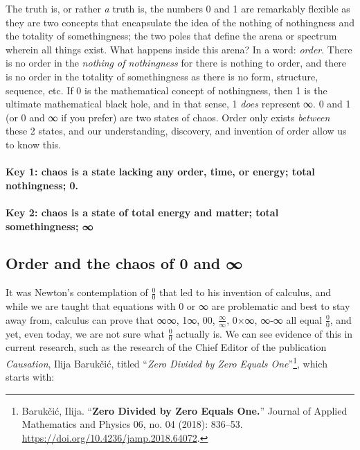 \documentclass[
]{article}
\begin{document}
The truth is, or rather \emph{a} truth is, the numbers 0 and 1 are
remarkably flexible as they are two concepts that encapsulate the idea
of the nothing of nothingness and the totality of somethingness; the two
poles that define the arena or spectrum wherein all things exist. What
happens inside this arena? In a word: \emph{order}. There is no order in
the \emph{nothing of nothingness} for there is nothing to order, and
there is no order in the totality of somethingness as there is no form,
structure, sequence, etc. If 0 is the mathematical concept of
nothingness, then 1 is the ultimate mathematical black hole, and in that
sense, 1 \emph{does} represent ∞. 0 and 1 (or 0 and ∞ if you prefer) are
two states of chaos. Order only exists \emph{between} these 2 states,
and our understanding, discovery, and invention of order allow us to
know this.

\paragraph{\texorpdfstring{\textbf{Key 1:} chaos is a state lacking any
order, time, or energy; total nothingness;
0.}{Key 1: chaos is a state lacking any order, time, or energy; total nothingness; 0.}}\label{key-1-chaos-is-a-state-lacking-any-order-time-or-energy--total-nothingness--0}

\paragraph{\texorpdfstring{\textbf{Key 2:} chaos is a state of total
energy and matter; total somethingness;
∞}{Key 2: chaos is a state of total energy and matter; total somethingness; ∞}}\label{key-2-chaos-is-a-state-of-total-energy-and-matter-total-somethingness}

\subsection{Order and the chaos of 0 and
∞}\label{order-and-the-chaos-of-0-and}

It was Newton's contemplation of \(\frac{0}{0}\) that led to his
invention of calculus, and while we are taught that equations with 0 or
∞ are problematic and best to stay away from, calculus can prove that
∞∞, 1∞, 00, \(\frac{\infty}{\infty}\), 0×∞, ∞-∞ all equal
\(\frac{0}{0}\), and yet, even today, we are not sure what
\(\frac{0}{0}\) actually is. We can see evidence of this in current
research, such as the research of the Chief Editor of the publication
\emph{Causation}, Ilija Barukčić, titled ``\emph{Zero Divided by Zero
Equals One}''\footnote{Barukčić, Ilija. ``\textbf{Zero Divided by Zero
  Equals One.}'' Journal of Applied Mathematics and Physics 06, no. 04
  (2018): 836--53. \url{https://doi.org/10.4236/jamp.2018.64072}.},
which starts with:
\end{document}
